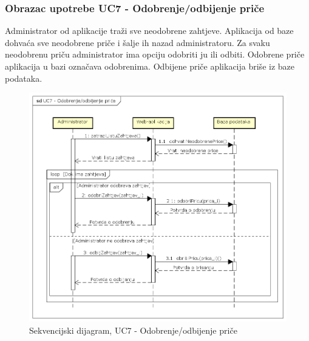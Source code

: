 				\subsubsection{Obrazac upotrebe UC7 - Odobrenje/odbijenje priče}
					\noindent Administrator od aplikacije traži sve neodobrene zahtjeve. Aplikacija od baze dohvaća sve neodobrene priče i šalje ih nazad administratoru. Za svaku neodobrenu priču administrator ima opciju odobriti ju ili odbiti. Odobrene priče aplikacija u bazi označava odobrenima. Odbijene priče aplikacija briše iz baze podataka.
					\begin{figure}[H]
						\includegraphics[width=.9\linewidth]{dijagrami/SD_UC7.png}
						\centering
						\caption{Sekvencijski dijagram, UC7 - Odobrenje/odbijenje priče}
						\label{fig:sekvdija2}
					\end{figure}
				
